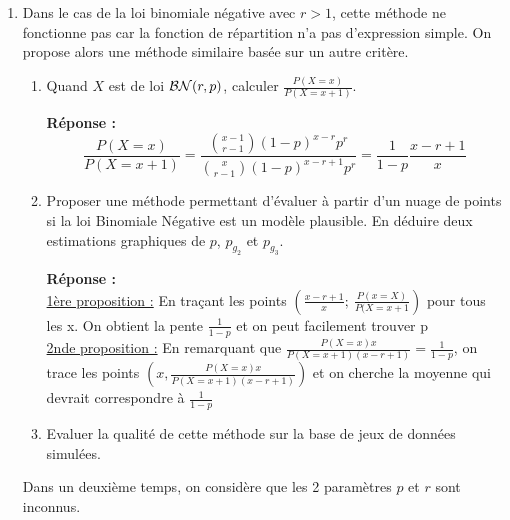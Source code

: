 \documentclass[12pt]{article}
\newcommand{\dsp}{\displaystyle}
\begin{document}
\begin{enumerate}
\vspace{3mm}

\item Dans le cas de la loi binomiale négative avec $r>1$, cette méthode ne fonctionne pas car la fonction de répartition n'a pas d'expression simple. On propose alors une méthode similaire basée sur un autre critère.

\begin{enumerate}

\vspace{3mm}

\item Quand $X$ est de loi ${\cal BN}(r,p)$, calculer ${\dsp \frac{P(X=x)}{P(X=x+1)}}$.

\textbf{Réponse :\\}
$$\frac{P(X=x)}{P(X=x+1)} = \frac{\binom{x-1}{r-1} (1-p)^{x-r} p^{r}}{\binom{x}{r-1} (1-p)^{x-r+1} p^{r}} = \frac{1}{1-p} \frac{x-r+1}{x}$$

\vspace{3mm}

\item Proposer une méthode permettant d'évaluer à partir d'un nuage de points si la loi Binomiale Négative est un modèle plausible. En déduire deux estimations graphiques de $p$, $p_{g_2}$ et $p_{g_3}$.

\textbf{Réponse :\\}
\underline{1ère proposition :} En traçant les points $\left({\dsp \frac{x-r+1}{x}; \ \frac{P(x=X)}{P(X=x+1}} \right)$ pour tous les x. On obtient la pente $\dsp \frac{1}{1-p}$ et on peut facilement trouver p \\
\underline{2nde proposition :} En remarquant que $\dsp \frac{P(X=x)x}{P(X=x+1) (x-r+1)} = \frac{1}{1-p} $, on trace les points $\left(x, \dsp \frac{P(X=x)x}{P(X=x+1) (x-r+1)} \right) $ et on cherche la moyenne qui devrait correspondre à $ \dsp \frac{1}{1-p} $ 
\vspace{3mm}

\item Evaluer la qualité de cette méthode sur la base de jeux de données simulées.

\end{enumerate}

\vspace{3mm}

\hspace{-5mm} Dans un deuxième temps, on considère que les 2 paramètres $p$ et $r$ sont inconnus.

\vspace{3mm}


\end{enumerate}
\end{document}
